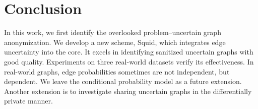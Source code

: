 \section{Conclusion}
In this work, we first identify the overlooked problem–uncertain graph anonymization. 
We develop a new scheme, Squid, which integrates edge uncertainty into the core. 
It excels in identifying sanitized uncertain graphs with good quality. 
Experiments on three real-world datasets verify its effectiveness. 
In real-world graphs, edge probabilities sometimes are not independent, but dependent.  We leave the conditional probability model as a future extension. 
Another extension is to investigate sharing uncertain graphs in the differentially private manner.